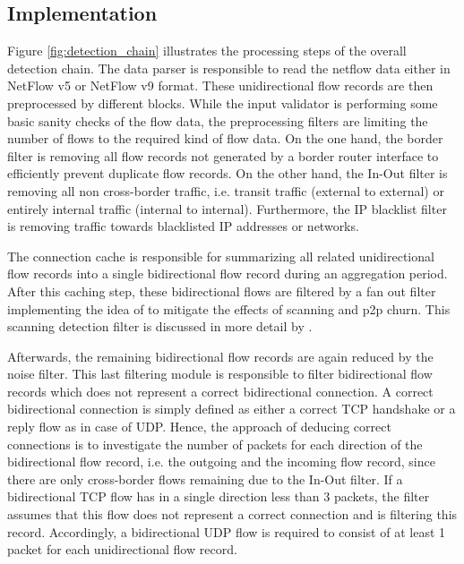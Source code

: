 \subsection{Implementation}
Figure \ref{fig:detection_chain} illustrates the processing steps of the 
overall detection chain. The data parser is responsible to read the netflow data 
either in NetFlow v5 or NetFlow v9 format. These unidirectional flow records are 
then preprocessed by different blocks. While the input validator is performing 
some basic sanity checks of the flow data, the preprocessing filters are 
limiting the number of flows to the required kind of flow data. On the one hand, 
the border filter is removing all flow records not generated by a border router 
interface to efficiently prevent duplicate flow records. On the other hand, the 
In-Out filter is removing all non cross-border traffic, i.e. transit traffic 
(external to external) or entirely internal traffic (internal to internal). 
Furthermore, the IP blacklist filter is removing traffic towards blacklisted IP 
addresses or networks.

The connection cache is responsible for summarizing all related unidirectional 
flow records into a single bidirectional flow record during an aggregation 
period. After this caching step, these bidirectional flows are filtered by a fan 
out filter implementing the idea of \citet{Allman:2007} to mitigate the effects 
of scanning and \gls{p2p} churn. This scanning detection filter is discussed in 
more detail by \citet{Schatzmann:Mining,Schatzmann:Dissection, 
Schatzmann:Tracing}. 

Afterwards, the remaining bidirectional flow records are again reduced by the 
noise filter. This last filtering module is responsible to filter bidirectional 
flow records which does not represent a correct bidirectional connection. A 
correct bidirectional connection is simply defined as either a correct \gls{TCP} 
handshake or a reply flow as in case of \gls{UDP}. Hence, the approach of deducing 
correct connections is to investigate the number of packets for each direction 
of the bidirectional flow record, i.e. the outgoing and the incoming flow 
record, since there are only cross-border flows remaining due to the In-Out 
filter. If a bidirectional \gls{TCP} flow has in a single direction less than 3 
packets, the filter assumes that this flow does not represent a correct 
connection and is filtering this record. Accordingly, a bidirectional \gls{UDP} 
flow is required to consist of at least 1 packet for each unidirectional flow 
record.


